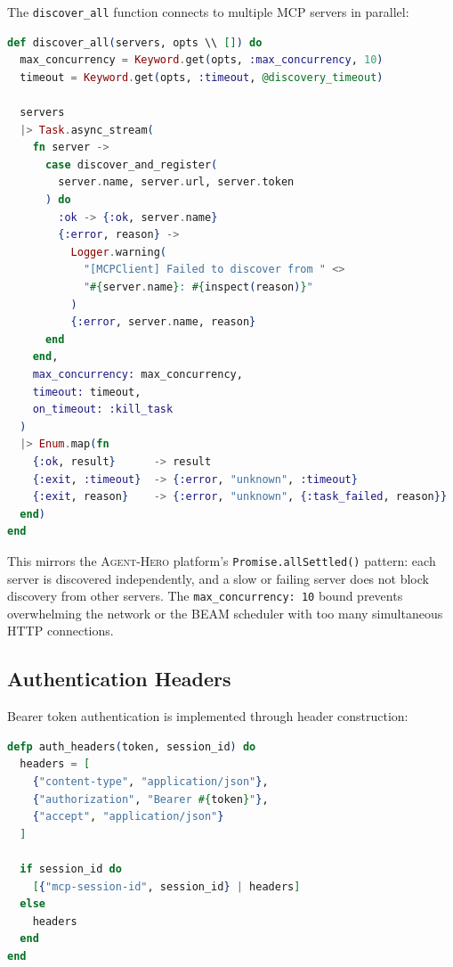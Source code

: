 \documentclass[12pt,a4paper]{article}
\theoremstyle{plain}
\theoremstyle{definition}
\newcommand{\agenthero}{\textsc{Agent-Hero}}
\begin{document}
The \texttt{discover\_all} function connects to multiple MCP servers in parallel:

\begin{lstlisting}[language=elixir, caption={Parallel MCP discovery with fault isolation.}, label={lst:discover-all}]
def discover_all(servers, opts \\ []) do
  max_concurrency = Keyword.get(opts, :max_concurrency, 10)
  timeout = Keyword.get(opts, :timeout, @discovery_timeout)

  servers
  |> Task.async_stream(
    fn server ->
      case discover_and_register(
        server.name, server.url, server.token
      ) do
        :ok -> {:ok, server.name}
        {:error, reason} ->
          Logger.warning(
            "[MCPClient] Failed to discover from " <>
            "#{server.name}: #{inspect(reason)}"
          )
          {:error, server.name, reason}
      end
    end,
    max_concurrency: max_concurrency,
    timeout: timeout,
    on_timeout: :kill_task
  )
  |> Enum.map(fn
    {:ok, result}      -> result
    {:exit, :timeout}  -> {:error, "unknown", :timeout}
    {:exit, reason}    -> {:error, "unknown", {:task_failed, reason}}
  end)
end
\end{lstlisting}

This mirrors the \agenthero{} platform's \texttt{Promise.allSettled()} pattern: each server is discovered independently, and a slow or failing server does not block discovery from other servers. The \texttt{max\_concurrency: 10} bound prevents overwhelming the network or the BEAM scheduler with too many simultaneous HTTP connections.

\subsection{Authentication Headers}

Bearer token authentication is implemented through header construction:

\begin{lstlisting}[language=elixir, caption={Authentication header construction with session ID.}, label={lst:auth-headers}]
defp auth_headers(token, session_id) do
  headers = [
    {"content-type", "application/json"},
    {"authorization", "Bearer #{token}"},
    {"accept", "application/json"}
  ]

  if session_id do
    [{"mcp-session-id", session_id} | headers]
  else
    headers
  end
end
\end{lstlisting}
\end{document}
